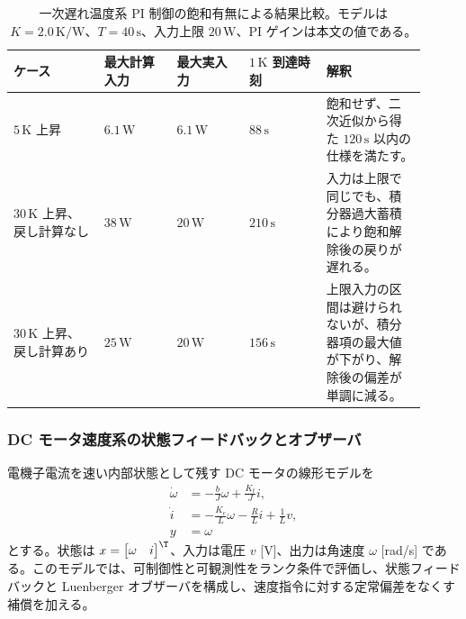 \begin{table}[tb]
  \centering
  \footnotesize
  \caption{一次遅れ温度系 PI 制御の飽和有無による結果比較。モデルは $K=2.0\,\mathrm{K/W}$、$T=40\,\mathrm{s}$、入力上限 $20\,\mathrm{W}$、PI ゲインは本文の値である。}
  \label{tab:w08-pi-aw-results}
  \begin{tabular}{@{}>{\raggedright\arraybackslash}p{0.20\linewidth}>{\raggedright\arraybackslash}p{0.16\linewidth}>{\raggedright\arraybackslash}p{0.16\linewidth}>{\raggedright\arraybackslash}p{0.17\linewidth}>{\raggedright\arraybackslash}p{0.22\linewidth}@{}}
    \hline
    ケース & 最大計算入力 & 最大実入力 & $1\,\mathrm{K}$ 到達時刻 & 解釈 \\
    \hline
    $5\,\mathrm{K}$ 上昇 &
    $6.1\,\mathrm{W}$ &
    $6.1\,\mathrm{W}$ &
    $88\,\mathrm{s}$ &
    飽和せず、二次近似から得た $120\,\mathrm{s}$ 以内の仕様を満たす。 \\
    $30\,\mathrm{K}$ 上昇、戻し計算なし &
    $38\,\mathrm{W}$ &
    $20\,\mathrm{W}$ &
    $210\,\mathrm{s}$ &
    入力は上限で同じでも、積分器過大蓄積により飽和解除後の戻りが遅れる。 \\
    $30\,\mathrm{K}$ 上昇、戻し計算あり &
    $25\,\mathrm{W}$ &
    $20\,\mathrm{W}$ &
    $156\,\mathrm{s}$ &
    上限入力の区間は避けられないが、積分器項の最大値が下がり、解除後の偏差が単調に減る。 \\
    \hline
  \end{tabular}
\end{table}

\subsubsection{DC モータ速度系の状態フィードバックとオブザーバ}

電機子電流を速い内部状態として残す DC モータの線形モデルを
\begin{align}
  \dot{\omega}&=-\frac{b}{J}\omega+\frac{K_t}{J}i,\\
  \dot{i}&=-\frac{K_e}{L}\omega-\frac{R}{L}i+\frac{1}{L}v,\\
  y&=\omega
\end{align}
とする。状態は $x=\begin{bmatrix}\omega&i\end{bmatrix}^\T$、入力は電圧 $v$ [V]、出力は角速度 $\omega$ [rad/s] である。このモデルでは、可制御性と可観測性をランク条件で評価し、状態フィードバックと Luenberger オブザーバを構成し、速度指令に対する定常偏差をなくす補償を加える。


